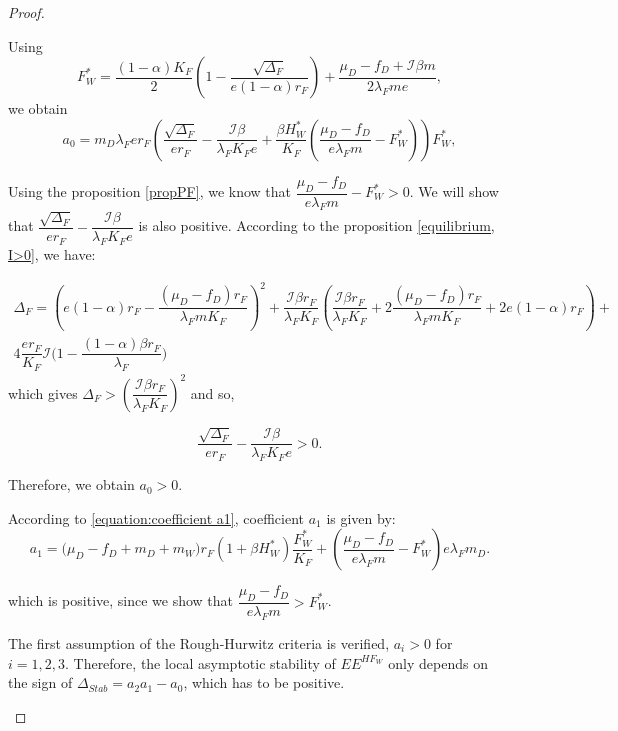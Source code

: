 \documentclass{article}
\newcommand{\lfw}{\lambda_{F}}
\newcommand{\lfw}{\lambda_{F}}
\newcommand{\cI}{\mathcal{I}}
\begin{document}
\begin{proof}
\begin{itemize}
Using
\begin{equation*}
F_W^* = \dfrac{(1-\alpha)K_F}{2}\left(1 - \dfrac{\sqrt{\Delta_F}}{e(1-\alpha)r_F}\right) + \dfrac{\mu_D - f_D + \cI \beta m}{2\lfw m e},
\end{equation*}
we obtain
\begin{equation*}
a_0 = m_D \lfw e r_F \left(\dfrac{\sqrt{\Delta_F}}{er_F} - \dfrac{\cI \beta}{\lfw K_F e} +  \dfrac{\beta H_W^*}{K_F} \left(\dfrac{\mu_D -f_D }{e \lfw m} - F_W^*\right)\right)  F^*_{W},
\end{equation*}

Using the proposition \ref{propPF}, we know that $\dfrac{\mu_D -f_D }{e \lfw m} - F_W^* > 0$. We will show that  $\dfrac{\sqrt{\Delta_F}}{er_F} - \dfrac{\cI \beta}{\lfw K_F e}$ is also positive. According to the proposition \ref{equilibrium, I>0}, we have:

\begin{multline*}
\Delta_F = \left(e(1-\alpha)r_F - \dfrac{(\mu_D - f_D) r_F}{\lfw m K_F}\right)^2 + \dfrac{\cI \beta r_F}{\lfw K_F} \left(\dfrac{\cI \beta r_F}{\lfw K_F} + 2\dfrac{(\mu_D - f_D) r_F}{\lfw m K_F} + 2e(1-\alpha)r_F \right) + \\ 4\dfrac{er_F}{K_F}  \cI\Big(1 - \dfrac{(1-\alpha)\beta r_F}{\lfw} \Big)
\end{multline*}
 which gives $\Delta_F > \left(\dfrac{\cI \beta r_F}{\lfw K_F}\right)^2$ and so,

\begin{equation*}
\dfrac{\sqrt{\Delta_F}}{er_F} - \dfrac{\cI \beta}{\lfw K_F e} > 0.
\end{equation*}

Therefore, we obtain $a_0 > 0$.

According to \eqref{equation:coefficient a1}, coefficient $a_1$ is given by:
\begin{equation*}
a_1 = \big( \mu_D  -f_D + m_D + m_W) r_F(1+ \beta H_W^*) \dfrac{F^*_W}{K_F} + \left(\dfrac{\mu_D -f_D}{e\lfw m} - F_W^*\right) e \lfw m_D .
\end{equation*}

which is positive, since we show that $\dfrac{\mu_D - f_D}{e \lfw m} > F^*_{W}$.

The first assumption of the Rough-Hurwitz criteria is verified, $a_i > 0$ for $i=1,2,3$. Therefore, the local asymptotic stability of $EE^{HF_W}$ only depends on the sign of $\Delta_{Stab}= a_2 a_1 - a_0$, which has to be positive.
\end{itemize}
\end{proof}
\end{document}
